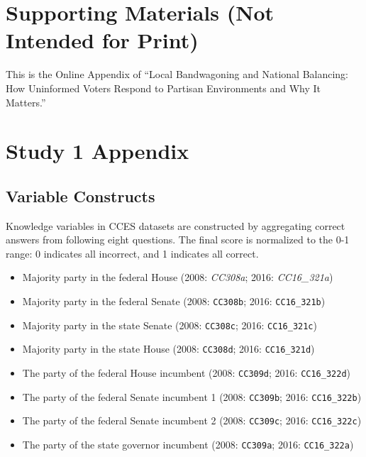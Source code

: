 \clearpage
\appendix

\section*{Supporting Materials (Not Intended for Print)}

\par This is the Online Appendix of ``Local Bandwagoning and National Balancing: How Uninformed Voters Respond to Partisan Environments and Why It Matters.'' 

\section{Study 1 Appendix} \label{appA}
\setcounter{table}{0}
\renewcommand{\thetable}{A\arabic{table}}
\setcounter{figure}{0}
\renewcommand{\thefigure}{A\arabic{figure}}

\subsection{Variable Constructs} 

\par Knowledge variables in CCES datasets are constructed by aggregating correct answers from following eight questions. The final score is normalized to the 0-1 range: 0 indicates all incorrect, and 1 indicates all correct.

\begin{itemize}
    \item Majority party in the federal House (2008: \textit{CC308a}; 2016: \textit{CC16\_321a})
    \item Majority party in the federal Senate (2008: \texttt{CC308b}; 2016: \texttt{CC16\_321b})
    \item Majority party in the state Senate (2008: \texttt{CC308c}; 2016: \texttt{CC16\_321c})
    \item Majority party in the state House (2008: \texttt{CC308d}; 2016: \texttt{CC16\_321d})
    \item The party of the federal House incumbent (2008: \texttt{CC309d}; 2016: \texttt{CC16\_322d})
    \item The party of the federal Senate incumbent 1 (2008: \texttt{CC309b}; 2016: \texttt{CC16\_322b})
    \item The party of the federal Senate incumbent 2 (2008: \texttt{CC309c}; 2016: \texttt{CC16\_322c})
    \item The party of the state governor incumbent (2008: \texttt{CC309a}; 2016: \texttt{CC16\_322a})
\end{itemize}

